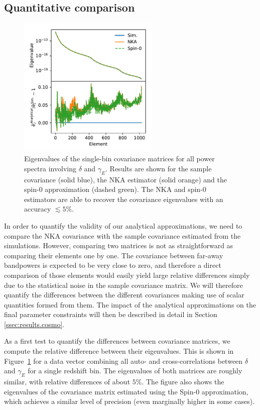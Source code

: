 \documentclass[a4paper,11pt]{article}
\begin{document}
    \subsection{Quantitative comparison}\label{ssec:results.quant}
      \begin{figure}
        \centering
        \includegraphics[width=0.6\textwidth]{./figures/run_sph_2b_NKA_TTTEEE_reldev_eigval_1stbin.pdf}
        \caption{Eigenvalues of the single-bin covariance matrices for all power spectra involving $\delta$ and $\gamma_E$. Results are shown for the sample covariance (solid blue), the NKA estimator (solid orange) and the spin-0 approximation (dashed green). The NKA and spin-0 estimators are able to recover the covariance eigenvalues with an accuracy $\lesssim5\%$.} \label{fig:eigv_1bin}
      \end{figure}
      In order to quantify the validity of our analytical approximations, we need to compare the NKA covariance with the sample covariance estimated from the simulations. However, comparing two matrices is not as straightforward as comparing their elements one by one. The covariance between far-away bandpowers is expected to be very close to zero, and therefore a direct comparison of those elements would easily yield large relative differences simply due to the statistical noise in the sample covariance matrix. We will therefore quantify the differences between the different covariances making use of scalar quantities formed from them. The impact of the analytical approximations on the final parameter constraints will then be described in detail in Section \ref{ssec:results.cosmo}.
      
      As a first test to quantify the differences between covariance matrices, we compute the relative difference between their eigenvalues. This is shown in Figure~\ref{fig:eigv_1bin} for a data vector combining all auto- and cross-correlations between $\delta$ and $\gamma_E$ for a single redshift bin. The eigenvalues of both matrices are roughly similar, with relative differences of about $5\%$. The figure also shows the eigenvalues of the covariance matrix estimated using the Spin-0 approximation, which achieves a similar level of precision (even marginally higher in some cases).
\end{document}
